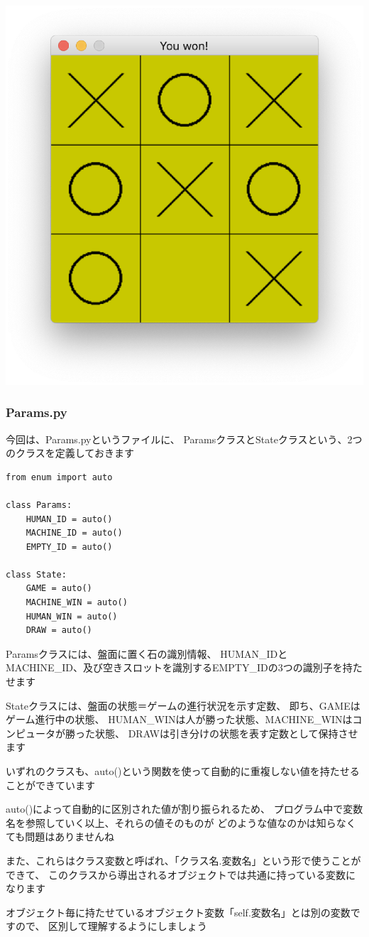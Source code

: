 \documentclass[uplatex,a4paper,11pt,oneside,openany]{jsbook}
\begin{document}
\begin{center}
  \includegraphics[width=0.4\hsize]{figures/eps/tictactoe.eps}
\end{center}

\subsubsection{Params.py}

今回は、Params.pyというファイルに、
ParamsクラスとStateクラスという、2つのクラスを定義しておきます

\begin{lstlisting}[caption=Params.py,label=prog05-1]
from enum import auto

class Params:
    HUMAN_ID = auto()
    MACHINE_ID = auto()
    EMPTY_ID = auto()

class State:
    GAME = auto()
    MACHINE_WIN = auto()
    HUMAN_WIN = auto()
    DRAW = auto()
\end{lstlisting}%

Paramsクラスには、盤面に置く石の識別情報、
HUMAN\_IDとMACHINE\_ID、及び空きスロットを識別するEMPTY\_IDの3つの識別子を持たせます

Stateクラスには、盤面の状態＝ゲームの進行状況を示す定数、
即ち、GAMEはゲーム進行中の状態、
HUMAN\_WINは人が勝った状態、MACHINE\_WINはコンピュータが勝った状態、
DRAWは引き分けの状態を表す定数として保持させます

いずれのクラスも、auto()という関数を使って自動的に重複しない値を持たせることができています

auto()によって自動的に区別された値が割り振られるため、
プログラム中で変数名を参照していく以上、それらの値そのものが
どのような値なのかは知らなくても問題はありませんね

また、これらはクラス変数と呼ばれ、「クラス名.変数名」という形で使うことができて、
このクラスから導出されるオブジェクトでは共通に持っている変数になります

オブジェクト毎に持たせているオブジェクト変数「self.変数名」とは別の変数ですので、
区別して理解するようにしましょう
\end{document}
